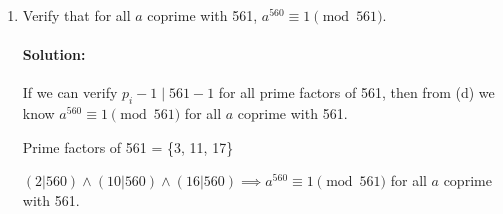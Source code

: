 \documentclass[11pt, notitlepage]{report}
\newenvironment{solution}{\paragraph{Solution:}}{\hfill}
\begin{document}
\begin{enumerate}[label=\alph*.)]

    \item Verify that for all $a$ coprime with 561, $a^{560} \equiv 1 \pmod{561}$.
	\begin{solution} If we can verify $p_i - 1 \mid 561 - 1$ for all prime factors of 561, then from (d) we know $a^{560} \equiv 1 \pmod{561}$ for all $a$ coprime with 561.
	
		Prime factors of 561 = \{3, 11, 17\}

		$(2|560)\land (10|560) \land (16|560) \implies$$a^{560} \equiv 1 \pmod{561}$ for all $a$ coprime with 561.
		
	\end{solution}

\end{enumerate}
\end{document}
